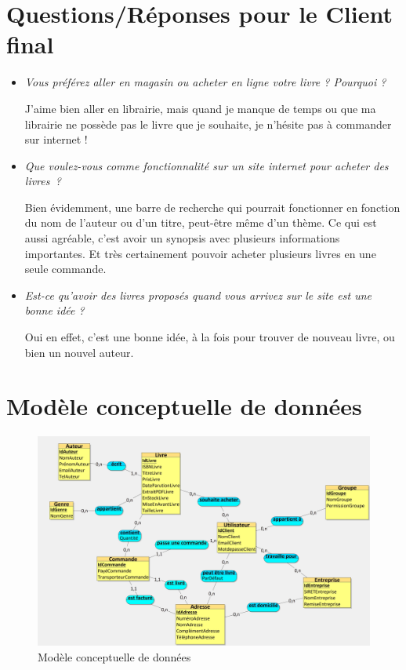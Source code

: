\documentclass[a4paper, 13pt]{article}
\begin{document}
\section{Questions/Réponses pour le Client final}
\begin{itemize}
    \item \textit{Vous préférez aller en magasin ou acheter en ligne votre livre ? Pourquoi ?}
    
    J’aime bien aller en librairie, mais quand je manque de temps ou que ma librairie ne possède pas le livre que je souhaite, je n’hésite pas à commander sur internet !
    
    \item \textit{Que voulez-vous comme fonctionnalité sur un site internet pour acheter des livres ?}
    
    Bien évidemment, une barre de recherche qui pourrait fonctionner en fonction du nom de l’auteur ou d’un titre, peut-être même d’un thème. Ce qui est aussi agréable, c'est avoir un synopsis avec plusieurs informations importantes. Et très certainement pouvoir acheter plusieurs livres en une seule commande.
    
    \item \textit{Est-ce qu'avoir des livres proposés quand vous arrivez sur le site est une bonne idée ?}
    
    Oui en effet, c'est une bonne idée, à la fois pour trouver de nouveau livre, ou bien un nouvel auteur.
\end{itemize}
\section{Modèle conceptuelle de données}

\begin{figure}[h]
    \centering
    \includegraphics[width=0.8\linewidth]{images/mcd.jpg}
    \caption{Modèle conceptuelle de données}
\end{figure}
\end{document}

